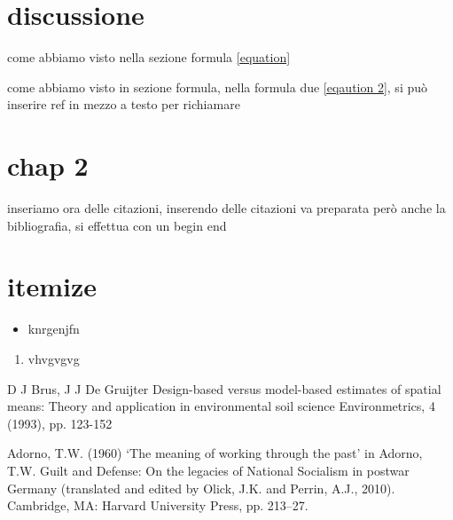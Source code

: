 \documentclass{article}
\begin{document}
\section{discussione}
come abbiamo visto nella sezione formula
\ref{equation}

come abbiamo visto in sezione formula, nella formula due \ref{eqaution 2}, si può inserire ref in mezzo a testo per richiamare
\section{chap 2}
inseriamo ora delle citazioni, inserendo delle citazioni va preparata però anche la bibliografia, si effettua con un begin end

\section{itemize}
\begin{itemize}
    \item knrgenjfn
\end{itemize}

\begin{enumerate}
    \item vhvgvgvg
\end{enumerate}
\begin{thebibliography}{999}

D J Brus, J J De Gruijter
Design-based versus model-based estimates of spatial means: Theory and application in environmental soil science
Environmetrics, 4 (1993), pp. 123-152

Adorno, T.W. (1960) ‘The meaning of working through the past’ in Adorno, T.W. Guilt and Defense: On the legacies of National Socialism in postwar Germany (translated and edited by Olick, J.K. and Perrin, A.J., 2010). Cambridge, MA: Harvard University Press, pp. 213–27.

\end{thebibliography}
\end{document}

